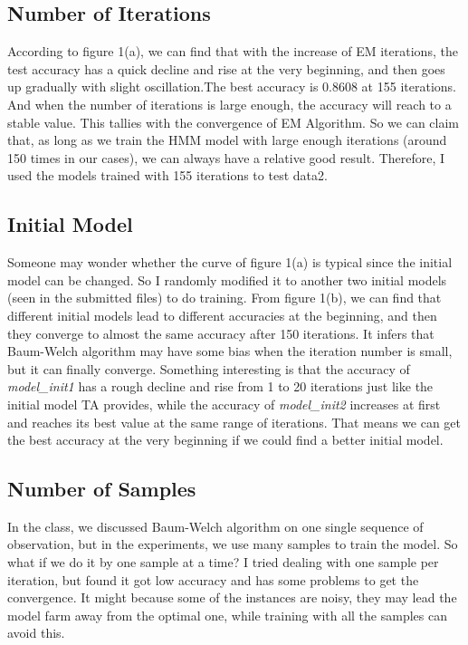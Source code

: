 \documentclass[11pt, oneside]{article}   	%
\begin{document}
\subsection{Number of Iterations}
According to figure 1(a), we can find that with the increase of EM iterations, the test accuracy has a quick decline and rise at the very beginning,  and then goes up gradually with slight oscillation.The best accuracy is 0.8608 at 155 iterations. And when the number of iterations is large enough, the accuracy will reach to a stable value. This tallies with the convergence of EM Algorithm. So we can claim that, as long as we train the HMM model with large enough iterations (around 150 times in our cases), we can always have a relative good result.  Therefore, I used the models trained with 155 iterations to test data2.
\subsection{Initial Model}
Someone may wonder whether the curve of figure 1(a) is typical since the initial model can be changed. So I randomly modified it to another two initial models (seen in the submitted files) to do training. From figure 1(b), we can find that different initial models lead to different accuracies at the beginning, and then they converge to almost the same accuracy after 150 iterations. It infers that Baum-Welch algorithm may have some bias when the iteration number is small, but it can finally converge. Something interesting is that the accuracy of \emph{model\_init1} has a rough decline and rise from 1 to 20 iterations just like the initial model TA provides, while the accuracy of \emph{model\_init2}  increases at first and reaches its best value at the same range of iterations. That means we can get the best accuracy at the very beginning if we could find a better initial model.
\subsection{Number of Samples}
In the class, we discussed Baum-Welch algorithm on one single sequence of observation, but in the experiments, we use many samples to train the model. So what if we do it by one sample at a time? I tried dealing with one sample per iteration,  but found it got low accuracy and has some problems to get the convergence. It might because some of the instances are noisy, they may lead the model farm away from the optimal one, while training with all the samples can avoid this.
\end{document}
